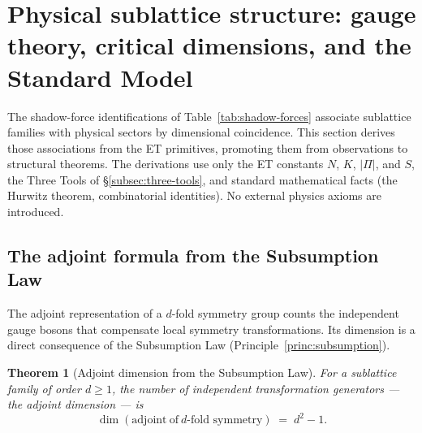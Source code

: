 \documentclass[11pt,a4paper]{article}
\newtheorem{theorem}{Theorem}[section]
\theoremstyle{definition}
\theoremstyle{remark}
\begin{document}
\section{Physical sublattice structure: gauge theory, critical dimensions, and the Standard Model}\label{sec:gauge}

The shadow-force identifications of Table~\ref{tab:shadow-forces} associate sublattice families with physical sectors by dimensional coincidence. This section derives those associations from the ET primitives, promoting them from observations to structural theorems. The derivations use only the ET constants $N$, $K$, $|\Pi|$, and $S$, the Three Tools of \S\ref{subsec:three-tools}, and standard mathematical facts (the Hurwitz theorem, combinatorial identities). No external physics axioms are introduced.

\subsection{The adjoint formula from the Subsumption Law}\label{subsec:adjoint}

The adjoint representation of a $d$-fold symmetry group counts the independent gauge bosons that compensate local symmetry transformations. Its dimension is a direct consequence of the Subsumption Law (Principle~\ref{princ:subsumption}).

\begin{theorem}[Adjoint dimension from the Subsumption Law]\label{thm:adjoint}
For a sublattice family of order $d \ge 1$, the number of independent transformation generators --- the adjoint dimension --- is
\[
\boxed{\;\dim(\mathrm{adjoint\ of\ }d\text{-fold symmetry}) \;=\; d^{2} - 1.\;}
\]
\end{theorem}
\end{document}
